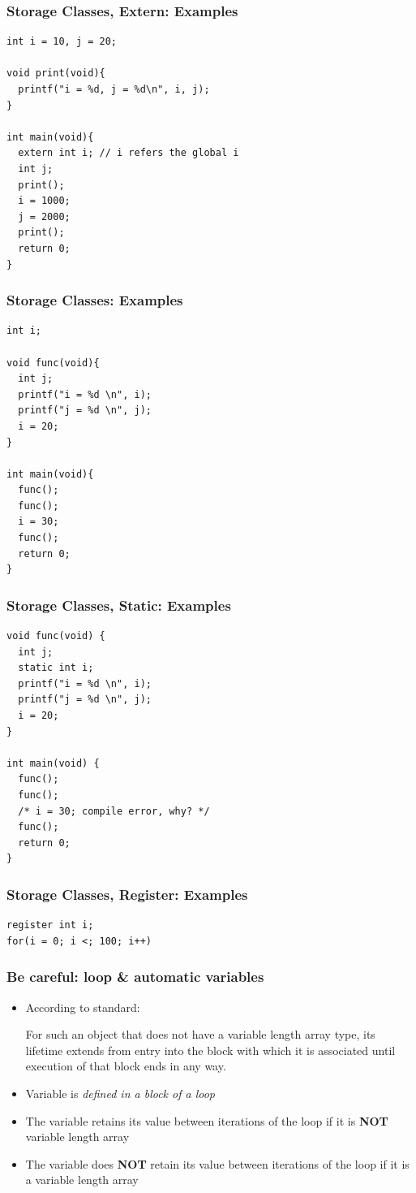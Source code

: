 \documentclass{../c-lecture}
\begin{document}
\begin{frame}[fragile]
  \frametitle{Storage Classes, Extern: Examples}
  \begin{verbatim}
int i = 10, j = 20;

void print(void){
  printf("i = %d, j = %d\n", i, j);
}

int main(void){
  extern int i; // i refers the global i
  int j;
  print();
  i = 1000;
  j = 2000;
  print();
  return 0;
}
  \end{verbatim}
\end{frame}

\begin{frame}[fragile]
  \frametitle{Storage Classes: Examples}
  \begin{verbatim}
int i;

void func(void){
  int j;
  printf("i = %d \n", i);
  printf("j = %d \n", j);
  i = 20;
}

int main(void){
  func();
  func();
  i = 30;
  func();
  return 0;
}
  \end{verbatim}
\end{frame}

\begin{frame}[fragile]
  \frametitle{Storage Classes, Static: Examples}
  \begin{verbatim}
void func(void) {
  int j;
  static int i;
  printf("i = %d \n", i);
  printf("j = %d \n", j);
  i = 20;
}

int main(void) {
  func();
  func();
  /* i = 30; compile error, why? */
  func();
  return 0;
}
  \end{verbatim}
\end{frame}

\begin{frame}
  \frametitle{Storage Classes, Register: Examples}
  \begin{verbatim}
register int i;
for(i = 0; i <; 100; i++)
  \end{verbatim}
\end{frame}

\begin{frame}
  \frametitle{Be careful: loop \& automatic variables}
  \begin{itemize}
    \item According to standard:
    \begin{block}{}
      For such an object that does not have a variable length array type, its
      lifetime extends from entry into the block with which it is associated
      until execution of that block ends in any way.
    \end{block}
    \item Variable is \textit{\color{Yellow} defined in a block of a loop}
    \item
      The variable retains its value between iterations of the loop if it is
      \textbf{\color{RubineRed} NOT} variable length array
    \item
      The variable does \textbf{\color{RubineRed} NOT} retain its value between
      iterations of the loop if it is a variable length array
  \end{itemize}
\end{frame}
\end{document}
